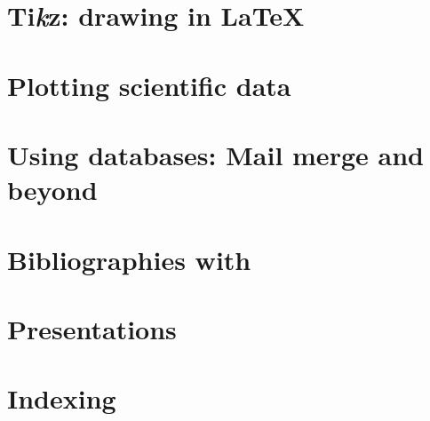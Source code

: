 \section{Ti\emph{k}z: drawing in \LaTeX{}}

\section{Plotting scientific data}

\section{Using databases: Mail merge and beyond}

\section{Bibliographies with }

\section{Presentations}

\section{Indexing}



